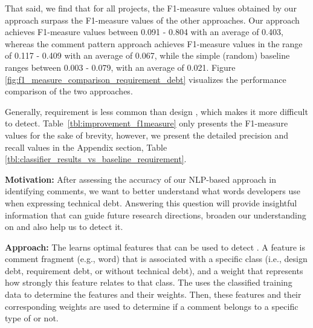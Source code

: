 That said, we find that for all projects, the F1-measure values obtained by our approach surpass the F1-measure values of the other approaches. Our approach achieves F1-measure values between 0.091 - 0.804 with an average of 0.403, whereas the comment pattern approach achieves F1-measure values in the range of 0.117 - 0.409 with an average of 0.067, while the simple (random) baseline ranges between 0.003 - 0.079, with an average of 0.021. Figure \ref{fig:f1_measure_comparison_requirement_debt} visualizes the performance comparison of the two approaches.

Generally, requirement \SATD is less common than design \SATD, which makes it more difficult to detect. Table~\ref{tbl:improvement_f1measure} only presents the F1-measure values for the sake of brevity, however, we present the detailed precision and recall values in the Appendix section, Table \ref{tbl:classifier_results_vs_baseline_requirement}.


\vspace{3mm}
\noindent\rqii
\vspace{3mm}

\noindent \textbf{Motivation:} After assessing the accuracy of our NLP-based approach in identifying \SATD comments, we want to better understand what words developers use when expressing technical debt. Answering this question will provide insightful information that can guide future research directions, broaden our understanding on \SATD and also help us to detect it.     

\vspace{1mm}
\noindent \textbf{Approach:} The  learns optimal features that can be used to detect \SATD. A feature is comment fragment (e.g., word) that is associated with a specific class (i.e., design debt, requirement debt, or without technical debt), and a weight that represents how strongly this feature relates to that class. The  uses the classified training data to determine the features and their weights. Then, these features and their corresponding weights are used to determine if a comment belongs to a specific type of \SATD or not.

